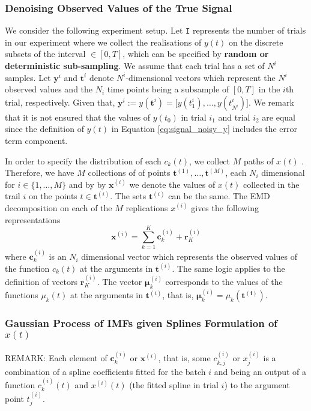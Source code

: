 \subsubsection{Denoising Observed Values of the True Signal}
We consider the following experiment setup. Let $\mathtt{I}$ represents the number of trials in our experiment where we collect the realisations of $y(t)$ on the discrete subsets of the interval $ \in [0,T]$, which can be specified by \textbf{random or deterministic sub-sampling}. We assume that each trial has a set of $N^i$ samples. Let  $\mathbf{y}^{i}$ and $\mathbf{t}^i$ denote $N^i$-dimensional vectors which represent the $N^i$ observed values and the $N_i$ time points being a subsample of $[0,T]$ in the $i$th trial, respectively. Given that, $\mathbf{y}^{i} := y(\mathbf{t}^i) = \big[y(t_1^i), \ldots, y(t_{N^i}^i) \big]$. We remark that it is not ensured that the values of $y(t_0)$ in trial $i_1$ and trial $i_2$ are equal since the definition of $y(t)$ in Equation \eqref{eq:signal_noisy_y} includes the error term component.


In order to specify the distribution of each $c_k(t)$, we collect $M$ paths of $x(t)$ . Therefore, we have $M$ collections of of points $\mathbf{t}^{(1)} , \ldots, \mathbf{t}^{(M)}$, each $N_i$ dimensional for $i \in \Big\{1,\ldots,M\Big\}$ and by  by $\mathbf{x}^{(i)}$ we denote the values of $x(t)$ collected in the trail $i$ on the points $t \in \mathbf{t}^{(i)}$.  The sets $\mathbf{t}^{(i)}$ can be the same.
The EMD decomposition on each of the $M$ replications  $x^{(i)}$ gives the following representations
\begin{equation}
\mathbf{x}^{(i)} = \sum_{k = 1}^K \mathbf{c}_k^{(i)}+ \mathbf{r}^{(i)}_K 
\end{equation}
where $\mathbf{c}_k^{(i)}$ is an $N_i$ dimensional vector which represents the observed values of the function $c_k(t)$ at the arguments in $\mathbf{t}^{(i)}$. The same logic applies to the definition of vectors $\mathbf{r}^{(i)}_K $. The vector $\bm{\mu}_k^{(i)}$  corresponds to the values of the functions $\mu_k(t)$ at the arguments in $\mathbf{t}^{(i)}$, that is, $\bm{\mu}_k^{(i)} = \mu_k(\mathbf{\mathbf{t}^{(i)}})$.

\subsubsection{Gaussian Process of IMFs given Splines Formulation of $x(t)$}

{\color{red}
REMARK: Each element of $\mathbf{c}_k^{(i)}$ or $\mathbf{x}^{(i)}$, that is, some $c_{k,j}^{(i)}$ or $x_{j}^{(i)}$ is a combination of a spline coefficients fitted for the batch $i$ and being an output of a function $c_k^{(i)}(t)$ and $x^{(i)}(t)$ (the fitted spline in trial $i$) to the argument point $t^{(i)}_j$.
}



